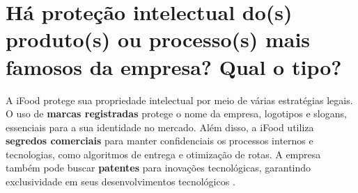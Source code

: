 \section{Há proteção intelectual do(s) produto(s) ou processo(s) mais famosos da empresa? Qual o tipo?}

A iFood protege sua propriedade intelectual por meio de várias estratégias legais. O uso de \textbf{marcas registradas} protege o nome da empresa, logotipos e slogans, essenciais para a sua identidade no mercado. Além disso, a iFood utiliza \textbf{segredos comerciais} para manter confidenciais os processos internos e tecnologias, como algoritmos de entrega e otimização de rotas. A empresa também pode buscar \textbf{patentes} para inovações tecnológicas, garantindo exclusividade em seus desenvolvimentos tecnológicos \cite{jurislaw2023, dlapiper2023}.

